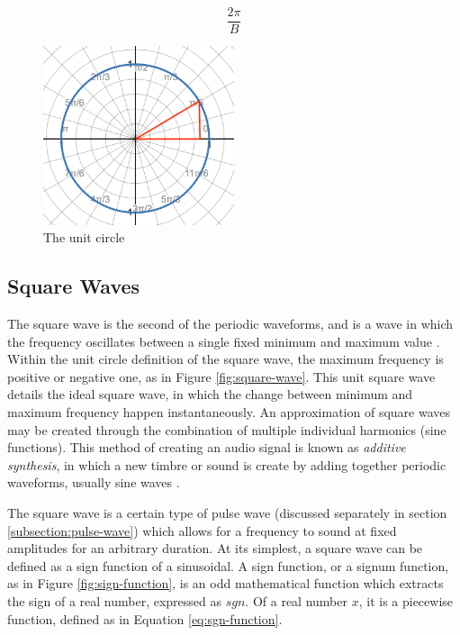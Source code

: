 \begin{equation}
	\frac{2\pi}{B}
	\label{eq:sine-wave-period}
\end{equation}

\begin{figure}
	\centering
	\includegraphics[width=0.5\textwidth]{figures/unit-circle.png}
	\caption{The unit circle}
	\label{fig:unit-circle}
\end{figure}

\subsection{Square Waves}
The square wave is the second of the periodic waveforms, and is a wave in which the frequency oscillates between a single fixed minimum and maximum value \cite{Tarr_2019}. Within the unit circle definition of the square wave, the maximum frequency is positive or negative one, as in Figure \ref{fig:square-wave}. This unit square wave details the ideal square wave, in which the change between minimum and maximum frequency happen instantaneously. An approximation of square waves may be created through the combination of multiple individual harmonics (sine functions). This method of creating an audio signal is known as \textit{additive synthesis}, in which a new timbre or sound is create by adding together periodic waveforms, usually sine waves \cite{Tarr_2019}. 

The square wave is a certain type of pulse wave (discussed separately in section \ref{subsection:pulse-wave}) which allows for a frequency to sound at fixed amplitudes for an arbitrary duration. At its simplest, a square wave can be defined as a sign function of a sinusoidal. A sign function, or a signum function, as in Figure \ref{fig:sign-function}, is an odd mathematical function which extracts the sign of a real number, expressed as $sgn$. Of a real number $x$, it is a piecewise function, defined as in Equation \ref{eq:sgn-function}.

